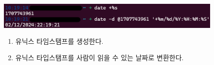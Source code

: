 \begin{figure}[h]
    \includegraphics[width=15cm]{resource/3-date-example}
    \label{fig:date-example}
    \begin{enumerate}
        \item 유닉스 타임스탬프를 생성한다.
        \item 유닉스 타입스탬프를 사람이 읽을 수 있는 날짜로 변환한다.
    \end{enumerate}
\end{figure}
